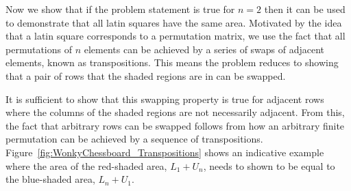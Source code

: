 Now we show that if the problem statement is true for $n = 2$ then it can be used to demonstrate that all latin squares have the same area. Motivated by the idea that a latin square corresponds to a permutation matrix, we use the fact that all permutations of $n$ elements can be achieved by a series of swaps of adjacent elements, known as transpositions. This means the problem reduces to showing that a pair of rows that the shaded regions are in can be swapped.

It is sufficient to show that this swapping property is true for adjacent rows where the columns of the shaded regions are not necessarily adjacent. From this, the fact that arbitrary rows can be swapped follows from how an arbitrary finite permutation can be achieved by a sequence of transpositions. Figure~\ref{fig:WonkyChessboard_Transpositions} shows an indicative example where the area of the red-shaded area, $L_1 + U_n$, needs to shown to be equal to the blue-shaded area, $L_n + U_1$.

